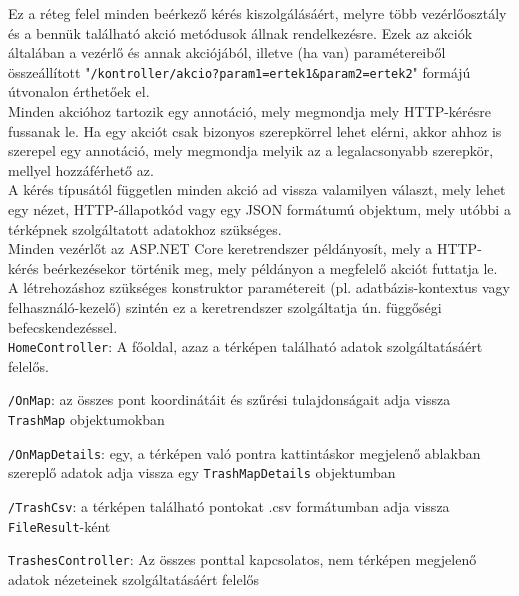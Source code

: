 Ez a réteg felel minden beérkező kérés kiszolgálásáért, melyre több vezérlőosztály és a bennük található akció metódusok állnak rendelkezésre. Ezek az akciók általában a vezérlő és annak akciójából, illetve (ha van) paramétereiből összeállított "\texttt{/kontroller/akcio?param1=ertek1\&param2=ertek2}" formájú útvonalon érthetőek el.\\
Minden akcióhoz tartozik egy annotáció, mely megmondja mely HTTP-kérésre fussanak le. Ha egy akciót csak bizonyos szerepkörrel lehet elérni, akkor ahhoz is szerepel egy annotáció, mely megmondja melyik az a legalacsonyabb szerepkör, mellyel hozzáférhető az.\\
A kérés típusától független minden akció ad vissza valamilyen választ, mely lehet egy nézet, HTTP-állapotkód vagy egy JSON formátumú objektum, mely utóbbi a térképnek szolgáltatott adatokhoz szükséges.\\
Minden vezérlőt az ASP.NET Core keretrendszer példányosít, mely a HTTP-kérés beérkezésekor történik meg, mely példányon a megfelelő akciót futtatja le. A létrehozáshoz szükséges konstruktor paramétereit (pl. adatbázis-kontextus vagy felhasználó-kezelő) szintén ez a keretrendszer szolgáltatja ún. függőségi befecskendezéssel.\\
\texttt{HomeController}: A főoldal, azaz a térképen található adatok szolgáltatásáért felelős.
\begin{compactitem}
	\item \texttt{/OnMap}: az összes pont koordinátáit és szűrési tulajdonságait adja vissza \texttt{TrashMap} objektumokban
	\item \texttt{/OnMapDetails}: egy, a térképen való pontra kattintáskor megjelenő ablakban szereplő adatok adja vissza egy \texttt{TrashMapDetails} objektumban
	\item \texttt{/TrashCsv}: a térképen található pontokat .csv formátumban adja vissza \texttt{FileResult}-ként
\end{compactitem}
\texttt{TrashesController}: Az összes ponttal kapcsolatos, nem térképen megjelenő adatok nézeteinek szolgáltatásáért felelős
